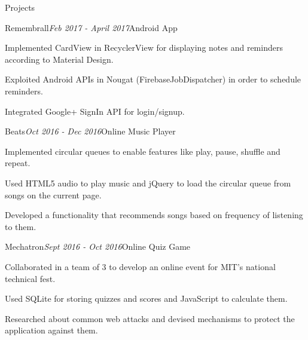 \documentclass{resume} %
\begin{document}
\begin{rSection}{Projects}
\begin{rSubsection}{Remembrall}{\em Feb 2017 - April 2017}{Android App}{}
  \item Implemented CardView in RecyclerView for displaying notes and reminders according to Material Design.
  \item Exploited Android APIs in Nougat (FirebaseJobDispatcher) in order to schedule reminders.
  \item Integrated Google+ SignIn API for login/signup.
 \end{rSubsection}
 \vspace{-2.15pt}
\begin{rSubsection}{Beats}{\em Oct 2016 - Dec 2016}{Online Music Player}{}
  \item Implemented circular queues to enable features like play, pause, shuffle and repeat.
  \item Used HTML5 audio to play music and jQuery to load the circular queue from songs on the current page.
  \item Developed a functionality that recommends songs based on frequency of listening to them.
\end{rSubsection}
\begin{rSubsection}{Mechatron}{\em Sept 2016 - Oct 2016}{Online Quiz Game}{}
  \item Collaborated in a team of 3 to develop an online event for MIT's national technical fest.
  \item Used SQLite for storing quizzes and scores and JavaScript to calculate them.
  \item Researched about common web attacks and devised mechanisms to protect the application against them.
\end{rSubsection}
\end{rSection}
\end{document}

